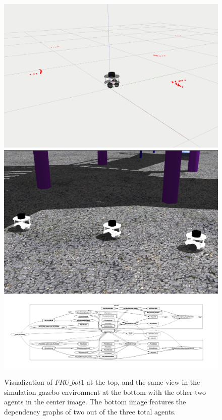 \documentclass[conference]{IEEEtran}
\begin{document}
\begin{figure}[H]
	\includegraphics[width=\linewidth]{./figs/multi_bots_viz.png}
	\vspace{4mm}
	\includegraphics[width=\linewidth]{./figs/multi_bots_sim.png}
	\vspace{4mm}
	\includegraphics[width=\linewidth]{./figs/multi_bots_nodes.png}
	\caption{Visualization of $FRU \_ bot1$ at the top, and the same view in the simulation gazebo environment at the bottom with the other two agents in the center image. The bottom image features the dependency graphs of two out of the three total agents.}
\end{figure}

\nocite{*}

\vspace{12pt}
\end{document}
